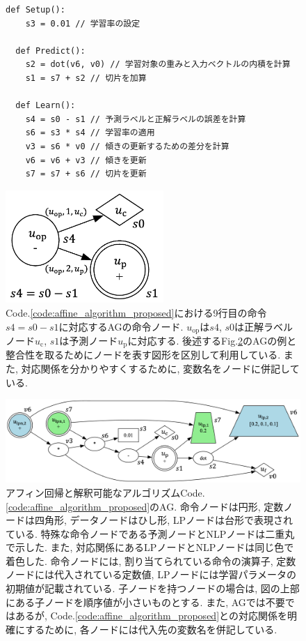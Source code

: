 \documentclass[11pt,oneside,openany,report]{jsbook}
\begin{document}
\begin{figure}[t]
\begin{lstlisting}[caption=アフィン回帰と解釈可能なアルゴリズム (Code.\ref{code:affine_algorithm}と同様),label=code:affine_algorithm_proposed]
  def Setup():
    s3 = 0.01 // 学習率の設定

  def Predict():
    s2 = dot(v6, v0) // 学習対象の重みと入力ベクトルの内積を計算
    s1 = s7 + s2 // 切片を加算

  def Learn():
    s4 = s0 - s1 // 予測ラベルと正解ラベルの誤差を計算
    s6 = s3 * s4 // 学習率の適用
    v3 = s6 * v0 // 傾きの更新するための差分を計算
    v6 = v6 + v3 // 傾きを更新
    s7 = s7 + s6 // 切片を更新
\end{lstlisting}
\end{figure}

\begin{figure}
  \centering
  \includegraphics[width=6cm]{mgg_automl_zero_vag/ag/op_node.png}
  \caption{Code.\ref{code:affine_algorithm_proposed}における9行目の命令$s4 = s0 - s1$に対応するAGの命令ノード. $u_\mathrm{op}$は$s4$, $s0$は正解ラベルノード$u_\mathrm{c}$, $s1$は予測ノード$u_\mathrm{p}$に対応する. 後述するFig.\ref{fig:mgg_automl_zero_vag:affine}のAGの例と整合性を取るためにノードを表す図形を区別して利用している. また, 対応関係を分かりやすくするために, 変数名をノードに併記している. }
  \label{fig:mgg_automl_zero_vag:op_node}
\end{figure}

\begin{figure}
  \centering
  \includegraphics[width=14cm]{mgg_automl_zero_vag/ag/affine.png}
  \caption{アフィン回帰と解釈可能なアルゴリズムCode.\ref{code:affine_algorithm_proposed}のAG.  命令ノードは円形, 定数ノードは四角形, データノードはひし形, LPノードは台形で表現されている. 特殊な命令ノードである予測ノードとNLPノードは二重丸で示した. また, 対応関係にあるLPノードとNLPノードは同じ色で着色した. 命令ノードには, 割り当てられている命令の演算子, 定数ノードには代入されている定数値, LPノードには学習パラメータの初期値が記載されている. 子ノードを持つノードの場合は, 図の上部にある子ノードを順序値が小さいものとする. また, AGでは不要ではあるが, Code.\ref{code:affine_algorithm_proposed}との対応関係を明確にするために, 各ノードには代入先の変数名を併記している. }
  \label{fig:mgg_automl_zero_vag:affine}
\end{figure}
\end{document}
